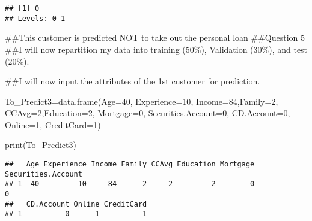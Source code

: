 \documentclass[
]{article}
\newenvironment{Shaded}{\begin{snugshade}}{\end{snugshade}}
\newcommand{\AttributeTok}[1]{\textcolor[rgb]{0.77,0.63,0.00}{#1}}
\newcommand{\ConstantTok}[1]{\textcolor[rgb]{0.00,0.00,0.00}{#1}}
\newcommand{\DecValTok}[1]{\textcolor[rgb]{0.00,0.00,0.81}{#1}}
\newcommand{\FloatTok}[1]{\textcolor[rgb]{0.00,0.00,0.81}{#1}}
\newcommand{\FunctionTok}[1]{\textcolor[rgb]{0.00,0.00,0.00}{#1}}
\newcommand{\NormalTok}[1]{#1}
\newcommand{\OtherTok}[1]{\textcolor[rgb]{0.56,0.35,0.01}{#1}}
\newcommand{\SpecialCharTok}[1]{\textcolor[rgb]{0.00,0.00,0.00}{#1}}
\begin{document}
\begin{verbatim}
## [1] 0
## Levels: 0 1
\end{verbatim}

\#\#This customer is predicted NOT to take out the personal loan
\#\#Question 5 \#\#I will now repartition my data into training (50\%),
Validation (30\%), and test (20\%).

\begin{Shaded}
\end{Shaded}

\#\#I will now input the attributes of the 1st customer for prediction.

\begin{Shaded}
\begin{Highlighting}[]
\NormalTok{To\_Predict3}\OtherTok{=}\FunctionTok{data.frame}\NormalTok{(}\AttributeTok{Age=}\DecValTok{40}\NormalTok{, }\AttributeTok{Experience=}\DecValTok{10}\NormalTok{,}
                      \AttributeTok{Income=}\DecValTok{84}\NormalTok{,}\AttributeTok{Family=}\DecValTok{2}\NormalTok{,}
                      \AttributeTok{CCAvg=}\DecValTok{2}\NormalTok{,}\AttributeTok{Education=}\DecValTok{2}\NormalTok{,}
                      \AttributeTok{Mortgage=}\DecValTok{0}\NormalTok{,}
                      \AttributeTok{Securities.Account=}\DecValTok{0}\NormalTok{,}
                      \AttributeTok{CD.Account=}\DecValTok{0}\NormalTok{,}
                      \AttributeTok{Online=}\DecValTok{1}\NormalTok{,}
                      \AttributeTok{CreditCard=}\DecValTok{1}\NormalTok{)}

\FunctionTok{print}\NormalTok{(To\_Predict3)}
\end{Highlighting}
\end{Shaded}

\begin{verbatim}
##   Age Experience Income Family CCAvg Education Mortgage Securities.Account
## 1  40         10     84      2     2         2        0                  0
##   CD.Account Online CreditCard
## 1          0      1          1
\end{verbatim}
\end{document}
